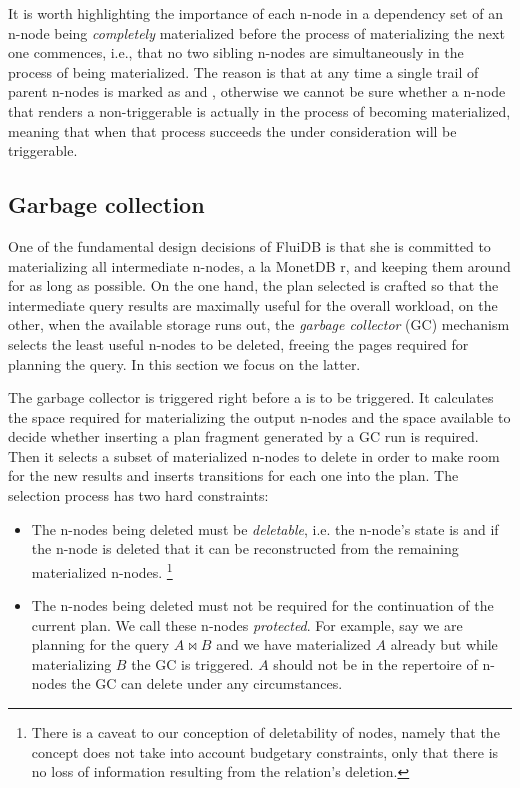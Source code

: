 It is worth highlighting the importance of each n-node in a dependency set of an n-node
being \emph{completely} materialized before the process of materializing the
next one commences, i.e., that no two sibling n-nodes are
simultaneously in the process of being materialized. The reason is
that at any time a single trail of parent n-nodes is marked as
 and , otherwise we cannot be sure whether a
 n-node that renders a 
non-triggerable is actually in the process of becoming materialized,
meaning that when that process succeeds the  under
consideration will be triggerable.

\subsection{Garbage collection}
\label{sec:gc}

One of the fundamental design decisions of FluiDB is that she is
committed to materializing all intermediate n-nodes, a la MonetDB \cite{idreosMonetdbTwoDecades2012}r, and keeping them
around for as long as possible. On the one hand, the plan selected is
crafted so that the intermediate query results are maximally useful for the
overall workload, on the other, when the available storage runs out,
the \emph{garbage collector} (GC) mechanism selects the least useful n-nodes to be
deleted, freeing the pages required for planning the query. In this section
we focus on the latter.

The garbage collector is triggered right before a  is to
be triggered. It calculates the space required for materializing the
output n-nodes and the space available to decide whether inserting a
plan fragment generated by a GC run is required. Then it selects a
subset of materialized n-nodes to delete in order to make room for the
new results and inserts  transitions for each one into the
plan. The selection process has two hard constraints:

\begin{itemize}
\item The n-nodes being deleted must be \emph{deletable}, i.e. the
  n-node's state is  and if the n-node is deleted that it
  can be reconstructed from the remaining materialized n-nodes.
  \footnote{There is a caveat to our conception of deletability of nodes, namely that
  the concept does not take into account budgetary constraints, only that there is no
  loss of information resulting from the relation's deletion.}
\item The n-nodes being deleted must not be required for the
  continuation of the current plan. We call these n-nodes
  \emph{protected}. For example, say we are planning for the query
  \(A \Join B\) and we have materialized \(A\) already but while
  materializing \(B\) the GC is triggered. \(A\) should not be in the
  repertoire of n-nodes the GC can delete under any circumstances.
\end{itemize}

